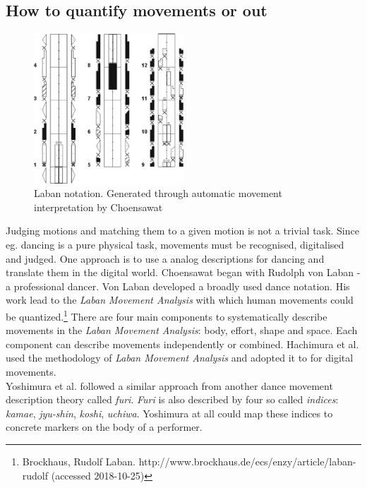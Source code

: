 
\subsection{How to quantify movements \todo or out}
\begin{figure}
	\centering
	\includegraphics[width=0.5\textwidth]{img/laban.png}
	\caption{Laban notation. Generated through automatic movement interpretation by Choensawat \cite{Choensawat2015}}
	\label{fig:movements_cont}
\end{figure}
Judging motions and matching them to a given motion is not a trivial task. Since eg. dancing is a pure physical task, movements must be recognised, digitalised and judged. One approach is to use a analog descriptions for dancing and translate them in the digital world. Choensawat \cite{Choensawat2015} began with Rudolph von Laban - a professional dancer. Von Laban developed a broadly used dance notation. His work lead to the \textit{Laban Movement Analysis} with which human movements could be quantized.\footnote{Brockhaus, Rudolf Laban. http://www.brockhaus.de/ecs/enzy/article/laban-rudolf (accessed 2018-10-25)} There are four main components to systematically describe movements in the \textit{Laban Movement Analysis}: body, effort, shape and space. Each component can describe movements independently or combined. Hachimura et al. \cite{Hachimura2005} used the methodology  of \textit{Laban Movement Analysis} and adopted it to for digital movements.\\
Yoshimura et al. \cite{Yoshimura2005} followed a similar approach from another dance movement description theory called \textit{furi}. \textit{Furi} is also described by four so called \textit{indices}: \textit{kamae}, \textit{jyu-shin}, \textit{koshi}, \textit{uchiwa}. Yoshimura at all could map these indices to concrete markers on the body of a performer.
